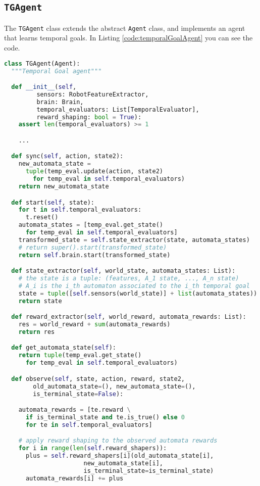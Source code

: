 \subsection{\texttt{TGAgent}}
The \texttt{TGAgent} class extends the abstract \texttt{Agent} class, and implements an agent that learns temporal goals. In Listing \ref{code:temporalGoalAgent} you can see the code.
\begin{lstlisting}[style=Python, language=Python, escapechar=£, label={code:temporalGoalAgent}, caption={\texttt{TGAgent}}]
class TGAgent(Agent):
  """Temporal Goal agent"""

  def __init__(self,
         sensors: RobotFeatureExtractor,
         brain: Brain,
         temporal_evaluators: List[TemporalEvaluator],
         reward_shaping: bool = True):
    assert len(temporal_evaluators) >= 1

    ...

  def sync(self, action, state2):
    new_automata_state =
      tuple(temp_eval.update(action, state2)
        for temp_eval in self.temporal_evaluators)
    return new_automata_state

  def start(self, state):
    for t in self.temporal_evaluators:
      t.reset()
    automata_states = [temp_eval.get_state()
      for temp_eval in self.temporal_evaluators]
    transformed_state = self.state_extractor(state, automata_states)
    # return super().start(transformed_state)
    return self.brain.start(transformed_state)

  def state_extractor(self, world_state, automata_states: List):
    # the state is a tuple: (features, A_1 state, ..., A_n state)
    # A_i is the i_th automaton associated to the i_th temporal goal
    state = tuple([self.sensors(world_state)] + list(automata_states))
    return state

  def reward_extractor(self, world_reward, automata_rewards: List):
    res = world_reward + sum(automata_rewards)
    return res

  def get_automata_state(self):
    return tuple(temp_eval.get_state()
      for temp_eval in self.temporal_evaluators)

  def observe(self, state, action, reward, state2,
        old_automata_state=(), new_automata_state=(),
        is_terminal_state=False):

    automata_rewards = [te.reward \
      if is_terminal_state and te.is_true() else 0
      for te in self.temporal_evaluators]

    # apply reward shaping to the observed automata rewards
    for i in range(len(self.reward_shapers)):
      plus = self.reward_shapers[i](old_automata_state[i],
                      new_automata_state[i],
                      is_terminal_state=is_terminal_state)
      automata_rewards[i] += plus


\end{lstlisting}
